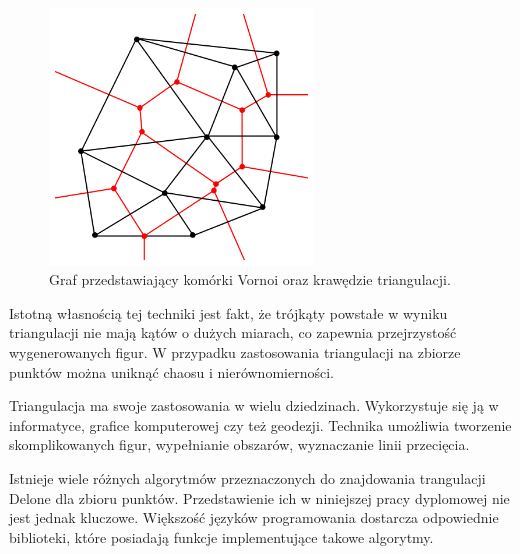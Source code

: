 \begin{figure}[h]
	\centering
	\includegraphics[width=7cm]{voronoi.png}
	\caption{Graf przedstawiający komórki Vornoi oraz krawędzie triangulacji. \cite{tDelone}} 
	\label{fig:voronoi}
\end{figure}

Istotną własnością tej techniki jest fakt, że trójkąty powstałe w wyniku triangulacji nie mają kątów o dużych miarach, co zapewnia przejrzystość wygenerowanych figur. W przypadku zastosowania triangulacji na zbiorze punktów można uniknąć chaosu i nierównomierności.

Triangulacja ma swoje zastosowania w wielu dziedzinach. Wykorzystuje się ją w informatyce, grafice komputerowej czy też geodezji. Technika umożliwia tworzenie skomplikowanych figur, wypełnianie obszarów, wyznaczanie linii przecięcia.

Istnieje wiele różnych algorytmów przeznaczonych do znajdowania trangulacji Delone dla zbioru punktów. Przedstawienie ich w niniejszej pracy dyplomowej nie jest jednak kluczowe. Większość języków programowania dostarcza odpowiednie biblioteki, które posiadają funkcje implementujące takowe algorytmy. 





